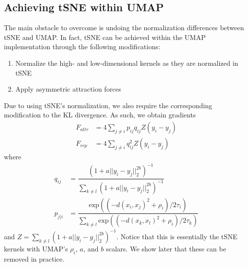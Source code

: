\documentclass{article}
\theoremstyle{definition}
\begin{document}
\begin{multicols}{2}
\subsection{Achieving tSNE within UMAP}
The main obstacle to overcome is undoing the normalization
differences between tSNE and UMAP. In fact, tSNE can be achieved within the UMAP implementation through the following modifications:
\begin{enumerate}
    \item Normalize the high- and low-dimensional kernels as they are normalized in tSNE
    \item Apply asymmetric attraction forces
\end{enumerate}
Due to using tSNE's normalization, we also require the corresponding modification to the KL divergence. As such, we obtain gradients
\begin{align*}
    F_{attr} &= 4 \sum_{j \neq i} p_{ij} q_{ij} Z (y_i - y_j) \\
   F_{rep} &= 4 \sum_{j \neq i} q_{ij}^2 Z (y_i - y_j)
\end{align*}
   where
\begin{align*}
   q_{ij} &= \dfrac{(1 + a ||y_i - y_j||_2^{2b})^{-1}}{\sum_{k \neq l} (1 + a ||y_i - y_j||_2^{2b})^{-1}} \\
    p_{j|i} &= \dfrac{\text{exp}( (-d(x_i, x_j)^2 + \rho_i) / 2 \tau_i)}{\sum_{k \neq l} \text{exp}( (-d(x_k, x_l)^2 + \rho_i) / 2 \tau_k)}
\end{align*}
   and $Z = \sum_{k \neq l} (1 + a ||y_i
   - y_j||_2^{2b})^{-1}$. Notice that this is essentially the tSNE kernels with UMAP's $\rho_i$, $a$, and $b$ scalars. We show later that these can be removed
   in practice.


\end{multicols}
\end{document}
